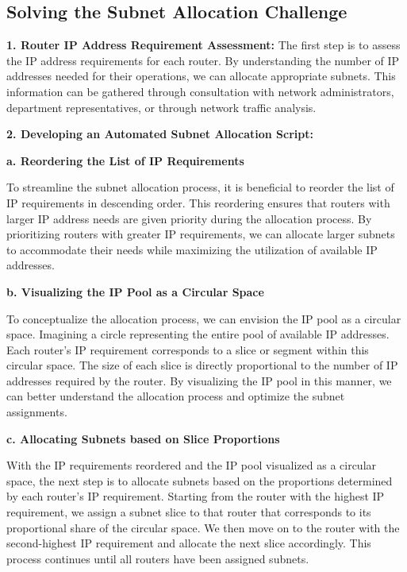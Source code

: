 \subsection{Solving the Subnet Allocation Challenge}

\textbf{1. Router IP Address Requirement Assessment:} The first step is to assess the IP address requirements for each router. By understanding the number of IP addresses needed for their operations, we can allocate appropriate subnets. This information can be gathered through consultation with network administrators, department representatives, or through network traffic analysis.

\textbf{2. Developing an Automated Subnet Allocation Script:}


\textbf{a. Reordering the List of IP Requirements}

To streamline the subnet allocation process, it is beneficial to reorder the list of IP requirements in descending order. This reordering ensures that routers with larger IP address needs are given priority during the allocation process. By prioritizing routers with greater IP requirements, we can allocate larger subnets to accommodate their needs while maximizing the utilization of available IP addresses.

\textbf{b. Visualizing the IP Pool as a Circular Space}

To conceptualize the allocation process, we can envision the IP pool as a circular space. Imagining a circle representing the entire pool of available IP addresses. Each router's IP requirement corresponds to a slice or segment within this circular space. The size of each slice is directly proportional to the number of IP addresses required by the router. By visualizing the IP pool in this manner, we can better understand the allocation process and optimize the subnet assignments.


\textbf{c. Allocating Subnets based on Slice Proportions}

With the IP requirements reordered and the IP pool visualized as a circular space, the next step is to allocate subnets based on the proportions determined by each router's IP requirement. Starting from the router with the highest IP requirement, we assign a subnet slice to that router that corresponds to its proportional share of the circular space. We then move on to the router with the second-highest IP requirement and allocate the next slice accordingly. This process continues until all routers have been assigned subnets.

